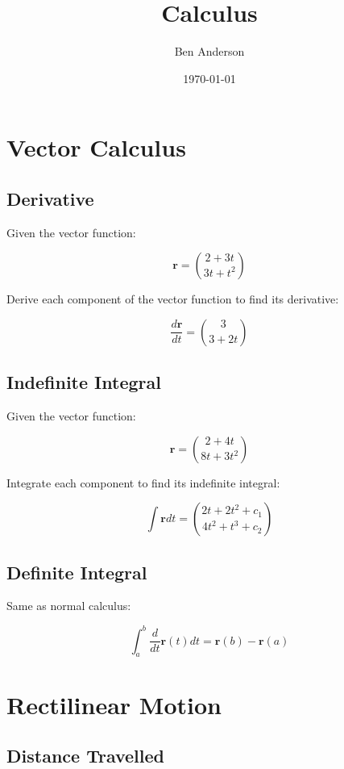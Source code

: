 \documentclass[a4paper,11pt]{article}
\newcommand{\bb}{\boldsymbol}
\begin{document}
\title{Calculus}
\author{Ben Anderson}
\date{\today}
\maketitle
\pagebreak

\tableofcontents
\pagebreak


\section{Vector Calculus}

\subsection{Derivative}

Given the vector function:

$$
\bb{r} = \binom{2 + 3t}{3t + t^2}
$$

Derive each component of the vector function to find its derivative:

$$
\frac{d\bb{r}}{dt} = \binom{3}{3 + 2t}
$$


\subsection{Indefinite Integral}

Given the vector function:

$$
\bb{r} = \binom{2 + 4t}{8t + 3t^2}
$$

Integrate each component to find its indefinite integral:

$$
\int \bb{r} dt = \binom{2t + 2t^2 + c_1}{4t^2 + t^3 + c_2}
$$


\subsection{Definite Integral}

Same as normal calculus:

$$
\int_a^b \frac{d}{dt}\bb{r}(t) dt = \bb{r}(b) - \bb{r}(a)
$$




\section{Rectilinear Motion}

\subsection{Distance Travelled}
\end{document}
